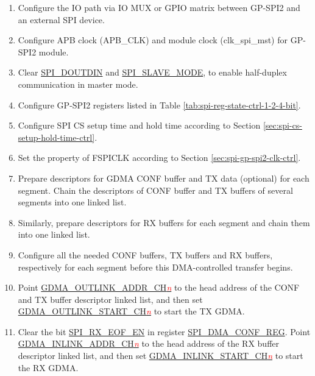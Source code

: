 \documentclass[main\_\_EN.tex]{subfiles}
\begin{document}
 \begin{enumerate}
    \item Configure the IO path via IO MUX or GPIO matrix between GP-SPI2 and an external SPI device.
    \item Configure APB clock (APB\_CLK) and module clock (clk\_spi\_mst) for GP-SPI2 module.

    \item Clear \hyperref[fielddesc:SPIDOUTDIN]{SPI\_DOUTDIN} and \hyperref[fielddesc:SPISLAVEMODE]{SPI\_SLAVE\_MODE}, to enable half-duplex communication in master mode.

    \item Configure GP-SPI2 registers listed in Table \ref{tab:spi-reg-state-ctrl-1-2-4-bit}.

    \item Configure SPI CS setup time and hold time according to Section \ref{sec:spi-cs-setup-hold-time-ctrl}.

    \item Set the property of FSPICLK according to Section \ref{sec:spi-gp-spi2-clk-ctrl}.

   \item Prepare descriptors for GDMA CONF buffer and TX data (optional) for each segment. Chain the descriptors of CONF buffer and TX buffers of several segments into one linked list.

   \item Similarly, prepare descriptors for RX buffers for each segment and chain them into one linked list.
   \item Configure all the needed CONF buffers, TX buffers and RX buffers, respectively for each segment before this DMA-controlled transfer begins.

   \item Point \hyperref[fielddesc:GDMAOUTLINKADDRCHN]{GDMA\_OUTLINK\_ADDR\_CH\textcolor{red}{\it{n}}} to the head address of the CONF and TX buffer descriptor linked list, and then set \hyperref[fielddesc:GDMAOUTLINKSTARTCHN]{GDMA\_OUTLINK\_START\_CH\textcolor{red}{\it{n}}} to start the TX GDMA.

   \item Clear the bit \hyperref[fielddesc:SPIRXEOFEN]{SPI\_RX\_EOF\_EN} in register \hyperref[regdesc:SPIDMACONFREG]{SPI\_DMA\_CONF\_REG}. Point \hyperref[fielddesc:GDMAINLINKADDRCHN]{GDMA\_INLINK\_ADDR\_CH\textcolor{red}{\it{n}}} to the head address of the RX buffer descriptor linked list, and then set \hyperref[fielddesc:GDMAINLINKSTARTCHN]{GDMA\_INLINK\_START\_CH\textcolor{red}{\it{n}}} to start the RX GDMA.


\end{enumerate}
\end{document}
